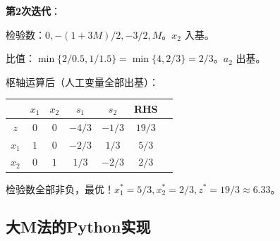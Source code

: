\begin{example}
\textbf{第2次迭代}：

检验数：$0, -(1+3M)/2, -3/2, M$。$x_2$ 入基。

比值：$\min\{2/0.5, 1/1.5\} = \min\{4, 2/3\} = 2/3$。$a_2$ 出基。

枢轴运算后（人工变量全部出基）：

\begin{table}[H]
\centering
\begin{tabular}{@{}c|ccccc|c@{}}
\toprule
& $x_1$ & $x_2$ & $s_1$ & $s_2$ & RHS \\
\midrule
$z$ & $0$ & $0$ & $-4/3$ & $-1/3$ & $19/3$ \\
\midrule
$x_1$ & $1$ & $0$ & $-2/3$ & $1/3$ & $5/3$ \\
$x_2$ & $0$ & $1$ & $1/3$ & $-2/3$ & $2/3$ \\
\bottomrule
\end{tabular}
\end{table}

检验数全部非负，最优！$x_1^* = 5/3, x_2^* = 2/3, z^* = 19/3 \approx 6.33$。
\end{example}

\subsection{大M法的Python实现}\label{sec:bigM-code}

